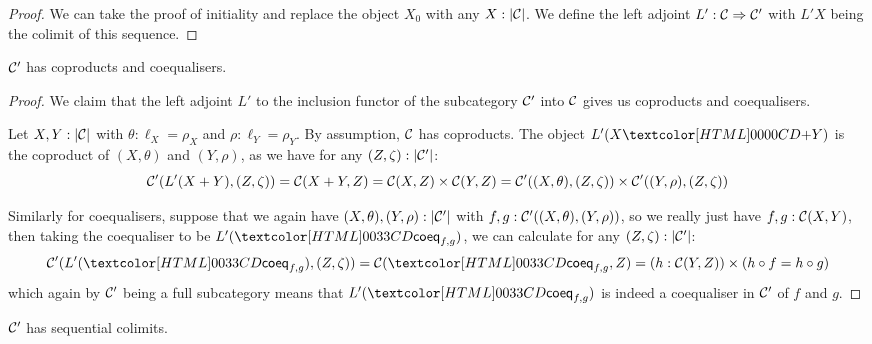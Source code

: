 \begin{proof}
  We can take the proof of initiality and replace the object $X_0$
  with any $X : | \mathcal{C} |$. We define the left adjoint
  $L' : \mathcal{C} \Rightarrow \mathcal{C}'$ with $L' X$ being the colimit of this
  sequence.
\end{proof}

\begin{proposition}
  $\mathcal{C}'$ has coproducts and coequalisers.
\end{proposition}

\begin{proof}
  We claim that the left adjoint $L'$ to the inclusion functor of the
  subcategory $\mathcal{C}'$ into $\mathcal{C}$ gives us coproducts and coequalisers. 

  Let $X, Y : | \mathcal{C} |$ with $\theta : \ell_X = \rho_X$ and
  $\rho : \ell_Y = \rho_Y$. By assumption, $\mathcal{C}$ has coproducts. The
  object $L' (\coproduct{X}{Y})$ is the coproduct of $(X,\theta)$ and $(Y,\rho)$,
  as we have for any $(Z,\zeta) : | \mathcal{C}' |$:
  $$
  \mathcal{C}'(L'(X+Y),(Z,\zeta)) = \mathcal{C}(X+Y,Z) = \mathcal{C}(X,Z) \times \mathcal{C}(Y,Z) = \mathcal{C}'((X,\theta),(Z,\zeta)) \times \mathcal{C}'((Y,\rho),(Z,\zeta))
  $$

  Similarly for coequalisers, suppose that we again have
  $(X,\theta), (Y,\rho) : | \mathcal{C}' |$ with
  $f, g : \mathcal{C}'((X,\theta),(Y,\rho))$, so we really just have
  $f, g : \mathcal{C}(X,Y)$, then taking the coequaliser to be
  $L' (\coeqty{f}{g})$, we can calculate for any $(Z,\zeta) : | \mathcal{C}' |$:
  $$
  \Cc'(L'(\coeqty{f}{g}),(Z,\zeta)) = \Cc(\coeqty{f}{g}, Z) = (h : \Cc(Y,Z)) \times (h \circ f = h \circ g)
  $$
  which again by $\mathcal{C}'$ being a full subcategory means that
  $L'(\coeqty{f}{g})$ is indeed a coequaliser in $\mathcal{C}'$ of $f$ and $g$.
\end{proof}

\begin{proposition}
  $\mathcal{C}'$ has sequential colimits.
\end{proposition}

